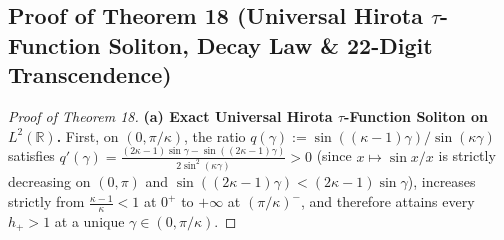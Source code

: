 \documentclass[10pt,letterpaper]{article}
\newcommand{\R}{\mathbb{R}}
\begin{document}
\subsection{Proof of Theorem 18 (Universal Hirota \texorpdfstring{$\tau$}{tau}-Function Soliton, Decay Law \& 22-Digit Transcendence)}

\begin{proof}[Proof of Theorem 18]
\textbf{(a) Exact Universal Hirota $\tau$-Function Soliton on $L^2(\R)$.}
First, on $(0, \pi/\kappa)$, the ratio $q(\gamma) := \sin((\kappa-1)\gamma)/\sin(\kappa\gamma)$ satisfies $q'(\gamma) = \frac{(2\kappa-1)\sin\gamma - \sin((2\kappa-1)\gamma)}{2\sin^2(\kappa\gamma)} > 0$ (since $x \mapsto \sin x / x$ is strictly decreasing on $(0, \pi)$ and $\sin((2\kappa-1)\gamma) < (2\kappa-1)\sin\gamma$), increases strictly from $\frac{\kappa-1}{\kappa} < 1$ at $0^+$ to $+\infty$ at $(\pi/\kappa)^-$, and therefore attains every $h_+ > 1$ at a unique $\gamma \in (0, \pi/\kappa)$.


\end{proof}
\end{document}
